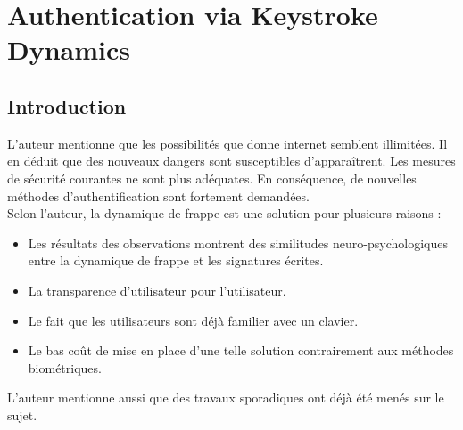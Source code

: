 \section{Authentication via Keystroke Dynamics\cite{monrose1997}}





\subsection{Introduction}

L’auteur mentionne que les possibilités que donne internet semblent illimitées. Il en déduit que des nouveaux dangers sont susceptibles d'apparaîtrent. Les mesures de sécurité courantes ne sont plus adéquates. En conséquence, de nouvelles méthodes d’authentification sont fortement demandées.\\

Selon l’auteur, la dynamique de frappe est une solution pour plusieurs raisons :\\

\begin{itemize}
\item Les résultats des observations montrent des similitudes neuro-psychologiques entre la dynamique de frappe et les signatures écrites.
\item La transparence d'utilisateur pour l'utilisateur.
\item Le fait que les utilisateurs sont déjà familier avec un clavier.
\item Le bas coût de mise en place d’une telle solution contrairement aux méthodes biométriques.\\
\end{itemize}

L’auteur mentionne aussi que des travaux sporadiques ont déjà été menés sur le sujet.\\

